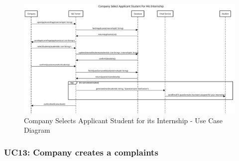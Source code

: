 \begin{figure}[H]
    \centering
    \includegraphics[width=1.0\textwidth]{Images/UC_12.pdf}
    \caption{Company Selects Applicant Student for its Internship - Use Case Diagram}
    \label{fig:use-case-diagram-12}
\end{figure}


\subsubsection{UC13: Company creates a complaints}
\label{subsubsec:company-creates-a-complaints}

